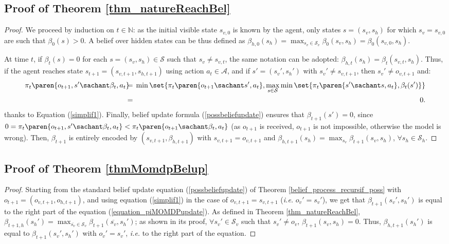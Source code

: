 \subsection{Proof of Theorem \ref{thm_natureReachBel}}
\label{thm_natureReachBel_RETURN}
\begin{proof}
We proceed by induction on $t \in \mathbb{N}$: as the initial visible state $s_{v,0}$ is known by the agent, only states $s=(s_v,s_h)$ for which $s_v=s_{v,0}$ are such that $\beta_0(s)>0$. A belief over hidden states can be thus defined as $\beta_{h,0}(s_h) = \max_{s_v \in \mathcal{S}_v} \beta_0(s_v,s_h) = \beta_0(s_{v,0},s_h)$.

 At time $t$, if $\beta_t(s)=0$ for each $ s=(s_v,s_h) \in \mathcal{S}$ such that $s_v \neq s_{v,t}$, the same notation can be adopted: $\beta_{h,t}(s_h) = \beta_{t}(s_{v,t},s_h)$. Thus, if the agent reaches state $s_{t+1}=(s_{v,t+1},s_{h,t+1})$ 
using action $a_t \in \mathcal{A}$,
and if $s' = (s_{v}',s_h')$ with $s_v' \neq s_{v,t+1}$, 
then $s_v' \neq o_{v,t+1}$ and:
\begin{eqnarray*} 
\pi_t \paren{ o_{t+1},s' \sachant \beta_{t},a_t} \hspace{-0.2cm}  
& = & \hspace{-0.2cm}  \min \set{ \pi_t \paren{ o_{t+1} \sachant s',a_t }, 
\max_{s \in \mathcal{S}} \min \set{ \pi_t \paren{ s' \sachant s,a_t }, \beta_{t}(s') } } \\
& = & \hspace{-0.2cm}  0.
\end{eqnarray*}
thanks to Equation (\ref{simplif1}). Finally, belief update formula (\ref{possbeliefupdate}) ensures that $\beta_{t+1}(s') = 0$,
since $0 = \pi_t \paren{ o_{t+1},s' \sachant \beta_{t},a_t} < \pi_t \paren{ o_{t+1}\sachant \beta_{t},a_t}$
(as $o_{t+1}$ is received, $o_{t+1}$ is not impossible, otherwise the model is wrong). 
Then, $\beta_{t+1}$ is entirely encoded by 
$(s_{v,t+1},\beta_{h,t+1})$ with $s_{v,t+1} = o_{v,t+1}$ and $\beta_{h,t+1}(s_h)= \max_{s_v} \beta_{t+1}(s_v,s_h)$, $\forall s_h \in \mathcal{S}_h$.
\end{proof}

\subsection{Proof of Theorem \ref{thmMomdpBelup}}
\label{thmMomdpBelup_RETURN}
\begin{proof}
Starting from the standard belief update equation (\ref{possbeliefupdate}) of Theorem \ref{belief_process_recursif_poss} 
with $o_{t+1}=(o_{v,t+1},o_{h,t+1})$, 
and using equation (\ref{simplif1}) in the case of $o_{v,t+1}=s_{v,t+1}$ (\textit{i.e.} $o_v'=s_v'$), 
we get that $\beta_{t+1}(s_v',s_h')$ is equal to the right part of the equation (\ref{equation_piMOMDPupdate}). 
As defined in Theorem \ref{thm_natureReachBel}, $\beta_{t+1,h}(s_h') = \max_{\overline{s_v} \in \mathcal{S}_v} \beta_{t+1}(\overline{s_v},s_h')$;
as shown in its proof, $\forall s_v' \in \mathcal{S}_v$ such that $s_v' \neq o_v$, $\beta_{t+1}(s_v,s_h)=0$.
Thus, $\beta_{h,t+1}(s_h')$ is equal to $\beta_{t+1}(s_v',s_h')$ with $o_v' = s_v'$,
\textit{i.e.} to the right part of the equation.
\end{proof}



